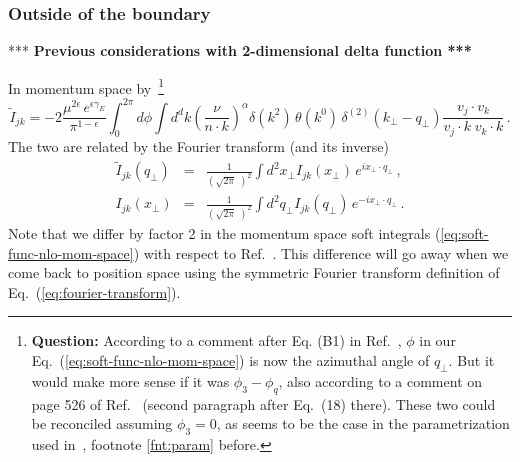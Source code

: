 \documentclass[a4paper,11pt]{report}
\numberwithin{equation}{section}
\newcommand{\question}[1]{{\bf Question:} #1}
\begin{document}
\subsubsection{Outside of the boundary}
\begin{center}
*** {\bf Previous considerations with 2-dimensional delta function ***}
\end{center}

In momentum space by~\footnote{
\question{
According to a comment after Eq. (B1) in Ref.~\cite{Li:2013mia}, $\phi$ in our
Eq.~(\ref{eq:soft-func-nlo-mom-space}) is now the azimuthal angle of $q_\perp$.
But it would make more sense if it was $\phi_3-\phi_{q}$, also according to a
comment on page 526 of Ref.~\cite{Catani:2014qha} (second paragraph after
Eq.~(18) there). These two could be reconciled assuming $\phi_3=0$, as seems to
be the case in the parametrization used in~\cite{Li:2013mia}, \cf footnote
\ref{fnt:param} before.
}
}
%
\begin{equation}
  \tilde I_{jk} = 
  -2 \frac{\mu^{2\epsilon}\, e^{\epsilon \gamma_E}}{\pi^{1-\epsilon}}
  \int_0^{2\pi} d\phi
  \int d^d k
  \left(\frac{\nu}{n\cdot k}\right)^\alpha
  \delta(k^2)\, \theta(k^0)\,
  \delta^{(2)}(k_\perp - q_\perp)
  \frac{v_j \cdot v_k}{v_j \cdot k\; v_k \cdot k}\,.
  \label{eq:soft-func-nlo-mom-space}
\end{equation}
%
The two are related by the Fourier transform (and its inverse)
%
\begin{subequations}
   \label{eq:fourier-transform}
   \begin{eqnarray}
     \tilde I_{jk} (q_\perp)& = &
     \frac{1}{\left(\sqrt{2\pi}\;\right)^2}
     \int d^2 x_\perp I_{jk} (x_\perp) \, e^{i x_\perp \cdot q_\perp}\,,
     \\
      \label{eq:fourier-transform-inv}
      I_{jk} (x_\perp)& = &
     \frac{1}{\left(\sqrt{2\pi}\;\right)^2}
     \int d^2 q_\perp I_{jk} (q_\perp) \, e^{-i x_\perp \cdot q_\perp}\,.
   \end{eqnarray}
\end{subequations}
%
Note that we differ by factor 2 in the momentum space soft integrals 
(\ref{eq:soft-func-nlo-mom-space}) with respect to Ref.~\cite{Li:2013mia}. This
difference will go away when we come back to position space using the symmetric
Fourier transform definition of Eq.~(\ref{eq:fourier-transform}).
\end{document}
